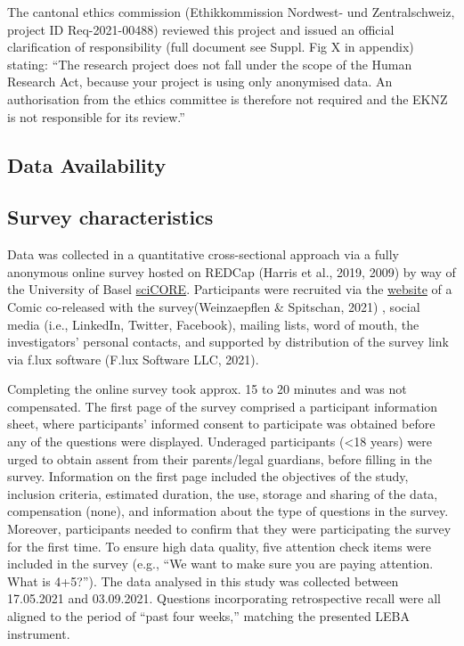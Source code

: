 \documentclass[
  english,
  man]{apa6}
\begin{document}
The cantonal ethics commission (Ethikkommission Nordwest- und Zentralschweiz, project ID Req-2021-00488) reviewed this project and issued an official clarification of responsibility (full document see Suppl. Fig X in appendix) stating: ``The research project does not fall under the scope of the Human Research Act, because your project is using only anonymised data. An authorisation from the ethics committee is therefore not required and the EKNZ is not responsible for its review.''

\hypertarget{data-availability}{%
\subsection{Data Availability}\label{data-availability}}

\hypertarget{survey-characteristics}{%
\subsection{Survey characteristics}\label{survey-characteristics}}

Data was collected in a quantitative cross-sectional approach via a fully anonymous online survey hosted on REDCap (Harris et al., 2019, 2009) by way of the University of Basel \href{https://redcap.scicore.unibas.ch}{sciCORE}. Participants were recruited via the \href{https://enlightenyourclock.org/participate-in-research}{website} of a Comic co-released with the survey(Weinzaepflen \& Spitschan, 2021) , social media (i.e., LinkedIn, Twitter, Facebook), mailing lists, word of mouth, the investigators' personal contacts, and supported by distribution of the survey link via f.lux software (F.lux Software LLC, 2021).

Completing the online survey took approx. 15 to 20 minutes and was not compensated. The first page of the survey comprised a participant information sheet, where participants' informed consent to participate was obtained before any of the questions were displayed. Underaged participants (\textless18 years) were urged to obtain assent from their parents/legal guardians, before filling in the survey. Information on the first page included the objectives of the study, inclusion criteria, estimated duration, the use, storage and sharing of the data, compensation (none), and information about the type of questions in the survey. Moreover, participants needed to confirm that they were participating the survey for the first time. To ensure high data quality, five attention check items were included in the survey (e.g., ``We want to make sure you are paying attention. What is 4+5?''). The data analysed in this study was collected between 17.05.2021 and 03.09.2021. Questions incorporating retrospective recall were all aligned to the period of ``past four weeks,'' matching the presented LEBA instrument.
\end{document}
